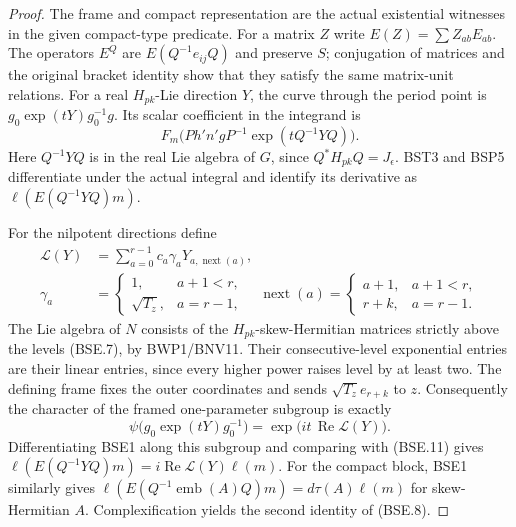 \begin{proof}
The frame and compact representation are the actual existential
witnesses in the given compact-type predicate.
For a matrix $Z$ write $E(Z)=\sum Z_{ab}E_{ab}$.
The operators $E^Q$ are $E(Q^{-1}e_{ij}Q)$ and preserve $S$;
conjugation of matrices and the original bracket identity show that
they satisfy the same matrix-unit relations.
For a real $H_{pk}$-Lie direction $Y$, the curve through the period
point is $g_0\exp(tY)g_0^{-1}g$.
Its scalar coefficient in the integrand is
\[
 F_m\bigl(P h'n'gP^{-1}\exp(tQ^{-1}YQ)\bigr).
 \tag{BSE.11}
\]
Here $Q^{-1}YQ$ is in the real Lie algebra of $G$, since
$Q^*H_{pk}Q=J_\epsilon$.
BST3 and BSP5 differentiate under the actual integral and identify
its derivative as $\ell(E(Q^{-1}YQ)m)$.

For the nilpotent directions define
\[
 \begin{split}
 \mathcal L(Y)&=\sum_{a=0}^{r-1}c_a\gamma_aY_{a,\operatorname{next}(a)},\\
 \gamma_a&=\begin{cases}1,&a+1<r,\\\sqrt{T_z},&a=r-1,\end{cases}
 \quad
 \operatorname{next}(a)=
       \begin{cases}a+1,&a+1<r,\\r+k,&a=r-1.\end{cases}
 \end{split}
 \tag{BSE.12}
\]
The Lie algebra of $N$ consists of the $H_{pk}$-skew-Hermitian
matrices strictly above the levels (BSE.7), by BWP1/BNV11.
Their consecutive-level exponential entries are their linear
entries, since every higher power raises level by at least two.
The defining frame fixes the outer coordinates and sends
$\sqrt{T_z}e_{r+k}$ to $z$.  Consequently the character of the
framed one-parameter subgroup is exactly
\[
 \psi\bigl(g_0\exp(tY)g_0^{-1}\bigr)
                         =\exp\bigl(it\,\operatorname{Re}\mathcal L(Y)\bigr).
 \tag{BSE.13}
\]
Differentiating BSE1 along this subgroup and comparing with
(BSE.11) gives
$\ell(E(Q^{-1}YQ)m)=i\operatorname{Re}\mathcal L(Y)\ell(m)$.
For the compact block, BSE1 similarly gives
$\ell(E(Q^{-1}\operatorname{emb}(A)Q)m)=d\tau(A)\ell(m)$
for skew-Hermitian $A$.  Complexification yields the second
identity of (BSE.8).


\end{proof}
